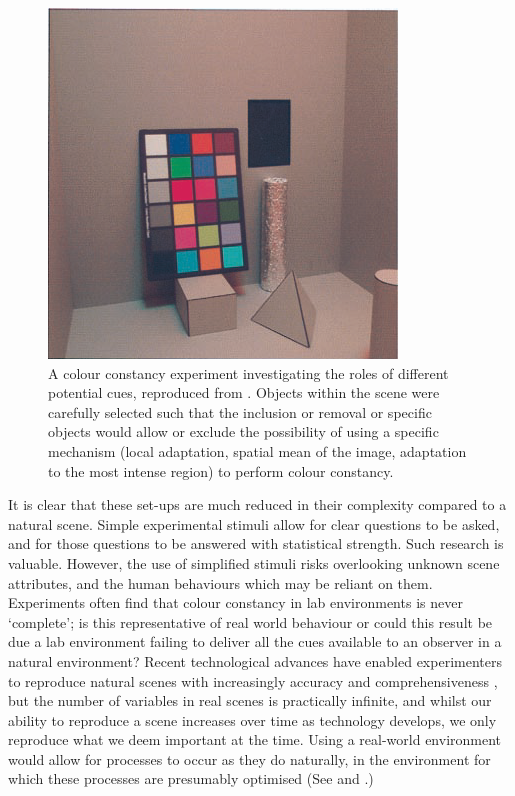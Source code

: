 \begin{figure}[hbp]
\includegraphics[max width=\textwidth]{figs/tablet/KraftBrainard.png}
\caption{A colour constancy experiment investigating the roles of different potential cues, reproduced from \citet{kraft_mechanisms_1999}. Objects within the scene were carefully selected such that the inclusion or removal or specific objects would allow or exclude the possibility of using a specific mechanism (local adaptation, spatial mean of the image, adaptation to the most intense region) to perform colour constancy.}
\label{fig:KraftBrainard}
\end{figure}

It is clear that these set-ups are much reduced in their complexity compared to a natural scene. Simple experimental stimuli allow for clear questions to be asked, and for those questions to be answered with statistical strength. Such research is valuable. However, the use of simplified stimuli risks overlooking unknown scene attributes, and the human behaviours which may be reliant on them. Experiments often find that colour constancy in lab environments is never `complete'; is this representative of real world behaviour or could this result be due a lab environment failing to deliver all the cues available to an observer in a natural environment? Recent technological advances have enabled experimenters to reproduce natural scenes with increasingly accuracy and comprehensiveness \citep{heasly_rendertoolbox3_2014}, but the number of variables in real scenes is practically infinite, and whilst our ability to reproduce a scene increases over time as technology develops, we only reproduce what we deem important at the time. Using a real-world environment would allow for processes to occur as they do naturally, in the environment for which these processes are presumably optimised (See \citet{kelly_chips_2018} and \citet{shepard_perceptual_1992}.)

